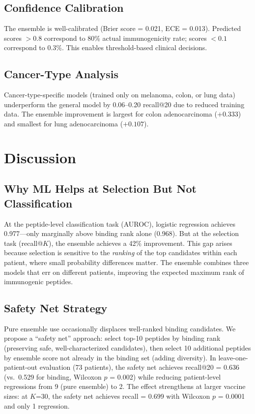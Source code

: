 \documentclass[11pt,twocolumn]{article}
\begin{document}
\subsection{Confidence Calibration}

The ensemble is well-calibrated (Brier score = 0.021, ECE = 0.013). Predicted scores $>0.8$ correspond to 80\% actual immunogenicity rate; scores $<0.1$ correspond to 0.3\%. This enables threshold-based clinical decisions.

\subsection{Cancer-Type Analysis}

Cancer-type-specific models (trained only on melanoma, colon, or lung data) underperform the general model by 0.06--0.20 recall@20 due to reduced training data. The ensemble improvement is largest for colon adenocarcinoma ($+0.333$) and smallest for lung adenocarcinoma ($+0.107$).

\section{Discussion}

\subsection{Why ML Helps at Selection But Not Classification}

At the peptide-level classification task (AUROC), logistic regression achieves 0.977---only marginally above binding rank alone (0.968). But at the selection task (recall@$K$), the ensemble achieves a 42\% improvement. This gap arises because selection is sensitive to the \textit{ranking} of the top candidates within each patient, where small probability differences matter. The ensemble combines three models that err on different patients, improving the expected maximum rank of immunogenic peptides.

\subsection{Safety Net Strategy}

Pure ensemble use occasionally displaces well-ranked binding candidates. We propose a ``safety net'' approach: select top-10 peptides by binding rank (preserving safe, well-characterized candidates), then select 10 additional peptides by ensemble score not already in the binding set (adding diversity). In leave-one-patient-out evaluation (73 patients), the safety net achieves recall@20 = 0.636 (vs.\ 0.529 for binding, Wilcoxon $p$ = 0.002) while reducing patient-level regressions from 9 (pure ensemble) to 2. The effect strengthens at larger vaccine sizes: at $K$=30, the safety net achieves recall = 0.699 with Wilcoxon $p$ = 0.0001 and only 1 regression.
\end{document}
